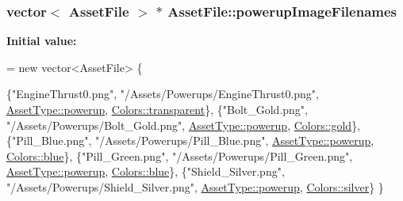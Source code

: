 \hypertarget{struct_asset_file_afcf268447c77710c71d5503668e0afb7}{
\subsubsection[{powerup\-Image\-Filenames}]{\setlength{\rightskip}{0pt plus 5cm}vector$<$ {\bf Asset\-File} $>$ $\ast$ Asset\-File\-::powerup\-Image\-Filenames\hspace{0.3cm}{\ttfamily [static]}}}\label{struct_asset_file_afcf268447c77710c71d5503668e0afb7}
{\bfseries Initial value\-:}
\begin{DoxyCode}
= \textcolor{keyword}{new} vector<AssetFile> \{

    \{\textcolor{stringliteral}{"EngineThrust0.png"}, \textcolor{stringliteral}{"/Assets/Powerups/EngineThrust0.png"}, 
      \hyperlink{_asset_file_i_o_8h_a72d924d1cb8e1544b6d5198e98d52ca9af287c6beccb1f257def546ad6acdd9e4}{AssetType::powerup}, \hyperlink{_character_data_8h_a55ecd4f2ec2ebfe8d5b0163e4ac2a967a5e96bf62b9b2c18fdb65564b4a18fd1f}{Colors::transparent}\},
    \{\textcolor{stringliteral}{"Bolt\_Gold.png"},     \textcolor{stringliteral}{"/Assets/Powerups/Bolt\_Gold.png"},     
      \hyperlink{_asset_file_i_o_8h_a72d924d1cb8e1544b6d5198e98d52ca9af287c6beccb1f257def546ad6acdd9e4}{AssetType::powerup}, \hyperlink{_character_data_8h_a55ecd4f2ec2ebfe8d5b0163e4ac2a967ae07e81c20cf5935f5225765f0af81755}{Colors::gold}\},
    \{\textcolor{stringliteral}{"Pill\_Blue.png"},     \textcolor{stringliteral}{"/Assets/Powerups/Pill\_Blue.png"},     
      \hyperlink{_asset_file_i_o_8h_a72d924d1cb8e1544b6d5198e98d52ca9af287c6beccb1f257def546ad6acdd9e4}{AssetType::powerup}, \hyperlink{_character_data_8h_a55ecd4f2ec2ebfe8d5b0163e4ac2a967a48d6215903dff56238e52e8891380c8f}{Colors::blue}\},
    \{\textcolor{stringliteral}{"Pill\_Green.png"},    \textcolor{stringliteral}{"/Assets/Powerups/Pill\_Green.png"},    
      \hyperlink{_asset_file_i_o_8h_a72d924d1cb8e1544b6d5198e98d52ca9af287c6beccb1f257def546ad6acdd9e4}{AssetType::powerup}, \hyperlink{_character_data_8h_a55ecd4f2ec2ebfe8d5b0163e4ac2a967a48d6215903dff56238e52e8891380c8f}{Colors::blue}\},
    \{\textcolor{stringliteral}{"Shield\_Silver.png"}, \textcolor{stringliteral}{"/Assets/Powerups/Shield\_Silver.png"}, 
      \hyperlink{_asset_file_i_o_8h_a72d924d1cb8e1544b6d5198e98d52ca9af287c6beccb1f257def546ad6acdd9e4}{AssetType::powerup}, \hyperlink{_character_data_8h_a55ecd4f2ec2ebfe8d5b0163e4ac2a967a97f014516561ef487ec368d6158eb3f4}{Colors::silver}\}
\}
\end{DoxyCode}


